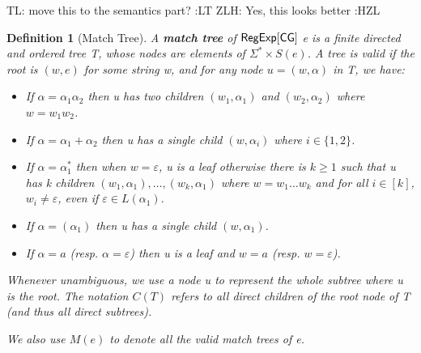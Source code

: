 \documentclass[sigplan,review,anonymous]{acmart}\settopmatter{printfolios=true,printccs=false,printacmref=false}
\newcommand{\tl}[1]{\color{blue} {TL: #1 :LT} \color{black}}
\newcommand{\zhilei}[1]{\color{violet} {ZLH: #1 :HZL} \color{black}}
\newcommand{\tl}[1]{}
\newcommand{\zhilei}[1]{}
\newcommand{\tmtextbf}[1]{{\bfseries{#1}}}
\newtheorem{definition}{Definition}
\begin{document}
\tl{move this to the semantics part?}
\zhilei{Yes, this looks better}

\begin{definition}[Match Tree]
  A \tmtextbf{match tree} of ${\sf RegExp}[\sf CG]$ e is a finite directed and ordered
  tree T, whose nodes are elements of $\Sigma^{\ast} \times S (e)$. A tree
  is valid if the root is $(w, e)$ for some string w, and for any node $u =
  (w, \alpha)$ in T, we have:
  \begin{itemize}
    \item If $\alpha = \alpha_1 \alpha_2$ then u has two children $(w_1,
    \alpha_1)$ and $(w_2, \alpha_2)$ where $w = w_1 w_2$.
    
    \item If $\alpha = \alpha_1 + \alpha_2$ then u has a single child $(w,
    \alpha_i)$ where $i \in \{ 1, 2 \}$.
    
    \item If $\alpha = \alpha_1^{\ast}$ then when $w = \varepsilon$, u is a
    leaf otherwise there is $k \geqslant 1$ such that u has k children $(w_1,
    \alpha_1), \ldots, (w_k, \alpha_1)$ where $w = w_1 \ldots w_k$ and for all
    $i \in [k]$, $w_i \neq \varepsilon$, even if $\varepsilon \in L
    (\alpha_1)$.
    
    \item If $\alpha = (\alpha_1)$ then u has a single child $(w, \alpha_1)$.
    
    \item If $\alpha = a$ (resp. $\alpha = \varepsilon$) then u is a leaf and
    $w = a$ (resp. $w = \varepsilon$).
  \end{itemize}
 
  Whenever unambiguous, we use a node u to represent the whole subtree
  where u is the root. The notation $C(T)$ refers to all direct children of the root node of T
  (and thus all direct subtrees).
  
  We also use $M (e)$ to denote all the valid match trees of e.
\end{definition}
\end{document}
